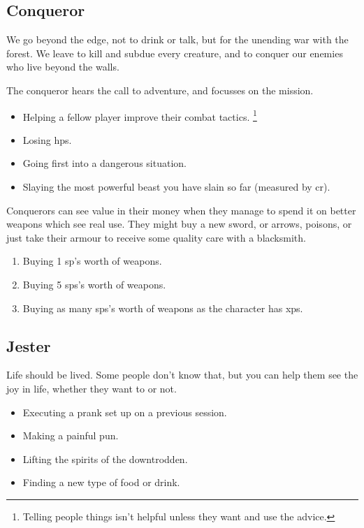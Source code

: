 \begin{multicols}{2}
\null

\subsection{Conqueror}
\label{conqueror}

We go beyond the \gls{edge}, not to drink or talk, but for the unending war with the forest.
We leave to kill and subdue every creature, and to conquer our enemies who live beyond the walls.

The conqueror hears the call to adventure, and focusses on the mission.

\begin{itemize}
  \item
  Helping a fellow player improve their combat tactics.%
  \footnote{Telling people things isn't helpful unless they want and use the advice.}
  \item
  Losing \glspl{hp}.
  \item
  Going first into a dangerous situation.
  \item
  Slaying the most powerful beast you have slain so far (measured by \gls{cr}).
\end{itemize}

Conquerors can see value in their money when they manage to spend it on better weapons which see real use.
They might buy a new sword, or arrows, poisons, or just take their armour to receive some quality care with a blacksmith.

\begin{enumerate}
  \item
  Buying 1 \gls{sp}'s worth of weapons.
  \item
  Buying 5 \glspl{sp}'s worth of weapons.
  \item
  Buying as many \glspl{sp}'s worth of weapons as the character has \glspl{xp}.
\end{enumerate}

\subsection{Jester}
\label{jester}

Life should be lived.
Some people don't know that, but you can help them see the joy in life, whether they want to or not.

\begin{itemize}
  \item
  Executing a prank set up on a previous session.
  \item
  Making a painful pun.
  \item
  Lifting the spirits of the downtrodden.
  \item
  Finding a new type of food or drink.
\end{itemize}


\end{multicols}
